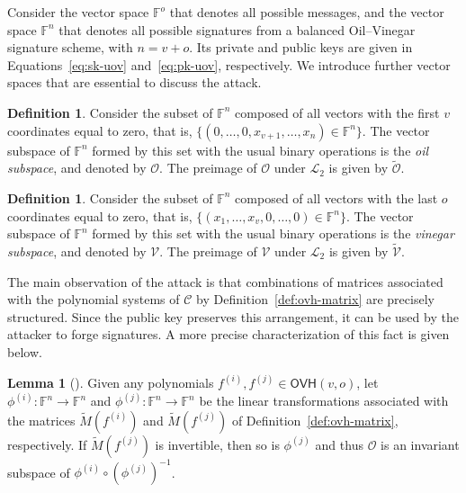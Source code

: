 \documentclass[english]{ufsc-thesis-rn46-2019/ufsc-thesis-rn46-2019}
\theoremstyle{definition}
\newtheorem{definition}[theorem]{Definition}
\newtheorem{lemma}[theorem]{Lemma}
\begin{document}
Consider the vector space $\mathbb{F}^{o}$ that denotes all possible messages,
and the vector space $\mathbb{F}^{n}$ that denotes all possible signatures from
a balanced Oil--Vinegar signature scheme, with $n = v + o$. Its private and
public keys are given in Equations~\ref{eq:sk-uov} and~\ref{eq:pk-uov},
respectively. We introduce further vector spaces that are essential to discuss
the attack.

\begin{definition}\label{def:oil-subspace}
  Consider the subset of $\mathbb{F}^{n}$ composed of all vectors with the
  first $v$ coordinates equal to zero, that is,
  $\{ (0, \dots, 0, x_{v + 1}, \dots, x_{n}) \in \mathbb{F}^{n} \}$. The vector
  subspace of $\mathbb{F}^{n}$ formed by this set with the usual binary
  operations is the \emph{oil subspace}, and denoted by $\mathcal{O}$. The
  preimage of $\mathcal{O}$ under $\mathcal{L}_{2}$ is given by
  $\widetilde{\mathcal{O}}$.
\end{definition}

\begin{definition}
  Consider the subset of $\mathbb{F}^{n}$ composed of all vectors with the last
  $o$ coordinates equal to zero, that is,
  $\{ (x_{1}, \dots, x_{v}, 0, \dots, 0) \in \mathbb{F}^{n} \}$. The vector
  subspace of $\mathbb{F}^{n}$ formed by this set with the usual binary
  operations is the \emph{vinegar subspace}, and denoted by $\mathcal{V}$. The
  preimage of $\mathcal{V}$ under $\mathcal{L}_{2}$ is given by
  $\widetilde{\mathcal{V}}$.
\end{definition}

The main observation of the attack is that combinations of matrices associated
with the polynomial systems of $\mathcal{C}$ by Definition~\ref{def:ovh-matrix}
are precisely structured. Since the public key preserves this arrangement, it
can be used by the attacker to forge signatures. A more precise
characterization of this fact is given below.

\begin{lemma}[{\cite[Lemma~1]{Kipnis:199904}}]
  Given any polynomials $f^{(i)}, f^{(j)} \in \textsf{OVH}(v, o)$, let
  $\phi^{(i)} : \mathbb{F}^{n} \to \mathbb{F}^{n}$ and
  $\phi^{(j)} : \mathbb{F}^{n} \to \mathbb{F}^{n}$ be the linear
  transformations associated with the matrices $\widetilde{M}(f^{(i)})$ and
  $\widetilde{M}(f^{(j)})$ of Definition~\ref{def:ovh-matrix}, respectively. If
  $\widetilde{M}(f^{(j)})$ is invertible, then so is $\phi^{(j)}$ and thus
  $\mathcal{O}$ is an invariant subspace of
  $\phi^{(i)} \circ {(\phi^{(j)})}^{-1}$.
\end{lemma}
\end{document}
